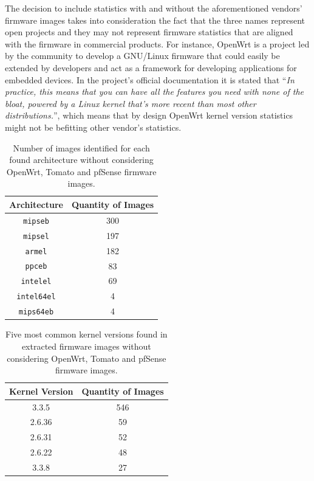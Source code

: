 The decision to include statistics with and without the aforementioned vendors' firmware images takes into consideration the fact that the three names represent open projects and they may not represent firmware statistics that are aligned with the firmware in commercial products. For instance, OpenWrt is a project led by the community to develop a GNU/Linux firmware that could easily be extended by developers and act as a framework for developing applications for embedded devices. In the project's official documentation it is stated that ``\textit{In practice, this means that you can have all the features you need with none of the bloat, powered by a Linux kernel that's more recent than most other distributions.}'', which means that by design OpenWrt kernel version statistics might not be befitting other vendor's statistics.

\begin{table}[H]
\centering
\caption{Number of images identified for each found architecture without considering OpenWrt, Tomato and pfSense firmware images.}
\begin{tabular}{|c|c|}
\hline
\textbf{Architecture}       & \textbf{Quantity of Images} \\ \hline
{\tt mipseb}                &  300                        \\ 
{\tt mipsel}                &  197                        \\ 
{\tt armel}                 &  182                        \\ 
{\tt ppceb}                 &   83                        \\ 
{\tt intelel}               &   69                        \\ 
{\tt intel64el}             &    4                        \\ 
{\tt mips64eb}              &    4                        \\ \hline
\end{tabular}
\label{tab:arch-stats}
\end{table}

\begin{table}[H]
\centering
\caption{Five most common kernel versions found in extracted firmware images without considering OpenWrt, Tomato and pfSense firmware images.}
\begin{tabular}{|c|c|}
\hline
\textbf{Kernel Version} & \textbf{Quantity of Images} \\ \hline
3.3.5                  & 546                 \\ 
2.6.36                 &  59                 \\ 
2.6.31                 &  52                 \\ 
2.6.22                 &  48                 \\ 
3.3.8                  &  27                 \\ \hline
\end{tabular}
\label{tab:kernel-stats}
\end{table}

